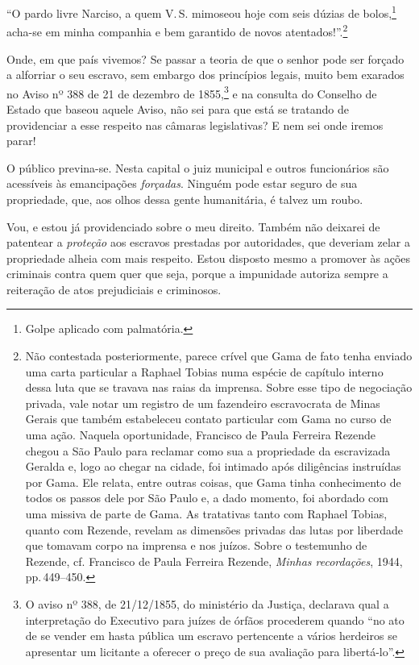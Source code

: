 ``O pardo livre Narciso, a quem V.\,S. mimoseou hoje com seis dúzias de
bolos,\footnote{ Golpe aplicado com palmatória.} acha-se em minha
companhia e bem garantido de novos atentados!''.\footnote{ Não
  contestada posteriormente, parece crível que Gama de fato tenha
  enviado uma carta particular a Raphael Tobias numa espécie de capítulo
  interno dessa luta que se travava nas raias da imprensa. Sobre esse
  tipo de negociação privada, vale notar um registro de um fazendeiro
  escravocrata de Minas Gerais que também estabeleceu contato particular
  com Gama no curso de uma ação. Naquela oportunidade, Francisco de
  Paula Ferreira Rezende chegou a São Paulo para reclamar como sua a
  propriedade da escravizada Geralda e, logo ao chegar na cidade, foi
  intimado após diligências instruídas por Gama. Ele relata, entre
  outras coisas, que Gama tinha conhecimento de todos os passos dele por
  São Paulo e, a dado momento, foi abordado com uma missiva de parte de
  Gama. As tratativas tanto com Raphael Tobias, quanto com Rezende,
  revelam as dimensões privadas das lutas por liberdade que tomavam
  corpo na imprensa e nos juízos. Sobre o testemunho de Rezende, cf.
  Francisco de Paula Ferreira Rezende, \emph{Minhas recordações}, 1944,
  pp.\,449--450.}

Onde, em que país vivemos? Se passar a teoria de que o senhor pode ser
forçado a alforriar o seu escravo, sem embargo dos princípios legais,
muito bem exarados no Aviso nº 388 de 21 de dezembro de 1855,\footnote{
  O aviso nº 388, de 21/12/1855, do ministério da Justiça, declarava
  qual a interpretação do Executivo para juízes de órfãos procederem
  quando ``no ato de se vender em hasta pública um escravo pertencente a
  vários herdeiros se apresentar um licitante a oferecer o preço de sua
  avaliação para libertá-lo''.} e na consulta do Conselho de Estado que
baseou aquele Aviso, não sei para que está se tratando de providenciar a
esse respeito nas câmaras legislativas? E nem sei onde iremos parar!

O público previna-se. Nesta capital o juiz municipal e outros
funcionários são acessíveis às emancipações \emph{forçadas}. Ninguém
pode estar seguro de sua propriedade, que, aos olhos dessa gente
humanitária, é talvez um roubo.

Vou, e estou já providenciado sobre o meu direito. Também não deixarei
de patentear a \emph{proteção} aos escravos prestadas por autoridades,
que deveriam zelar a propriedade alheia com mais respeito. Estou
disposto mesmo a promover às ações criminais contra quem quer que seja,
porque a impunidade autoriza sempre a reiteração de atos prejudiciais e
criminosos.

